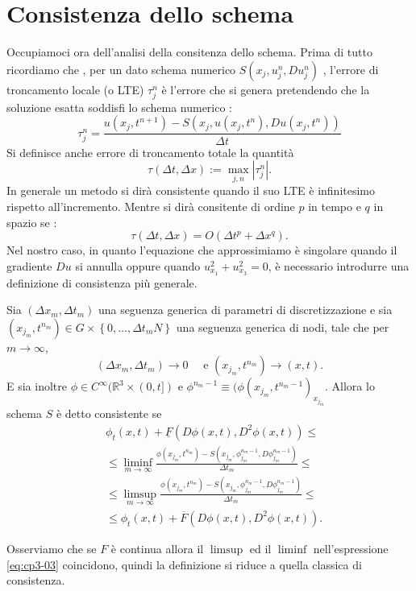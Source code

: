 \section{Consistenza dello schema}
Occupiamoci ora dell'analisi della consitenza dello schema. Prima di tutto ricordiamo che , per un dato schema numerico $S(x_j,u_j^n,Du_j^n)$ , l'errore di troncamento locale (o LTE) $\tau_j^n$ è l'errore che si genera pretendendo che la soluzione esatta soddisfi lo schema numerico :
\[
\tau_j^n=\frac{u(x_j,t^{n+1})-S(x_j,u(x_j,t^n),Du(x_j,t^n))}{\Delta t}
\]
Si definisce anche errore di troncamento totale la quantità
\[
\tau(\Delta t,\Delta x) := \max_{j,n} |\tau_j^n|.
\]
In generale un metodo si dirà consistente quando il suo LTE è infinitesimo rispetto all'incremento. Mentre si dirà consitente di ordine $p$ in tempo e $q$ in spazio se :
\[
\tau(\Delta t,\Delta x) = O(\Delta t^p +\Delta x^q).
\] 
Nel nostro caso, in quanto l'equazione che approssimiamo è singolare quando il gradiente  $Du$ si annulla oppure quando $u_{x_1}^2+u_{x_3}^2=0$, è necessario introdurre una definizione di consistenza più generale.
\begin{definizione}
Sia $(\Delta x_m,\Delta t_m)$ una seguenza generica di parametri di discretizzazione e sia $(x_{j_m},t^{n_m})\in G\times\left\{0,\dots,\Delta t_mN\right\}$ una seguenza generica di nodi, tale che per $m\to\infty$,
\[
(\Delta x_m,\Delta t_m)\to0 \quad\text{ e } (x_{j_m},t^{n_m})\to(x,t).
\]
E sia inoltre $\phi\in C^{\infty}(\mathbb{R}^3\times(0,t])$ e $\phi^{n_m-1}\equiv(\phi(x_{j_m},t^{n_m-1})_{x_{j_m}}$. Allora lo schema $S$ è detto consistente se
\begin{equation}
\label{eq:cp3-03}
\begin{split}
&\phi_t(x,t)+\underline{F}(D\phi(x,t),D^2\phi(x,t))\le \\
&\le\liminf_{m\to\infty}\frac{\phi(x_{j_m},t^{n_m})-S(x_{j_m},\phi_{j_m}^{n_m-1},D\phi_{j_m}^{n_m-1})}{\Delta t_m}\le \\
&\le\limsup_{m\to\infty}\frac{\phi(x_{j_m},t^{n_m})-S(x_{j_m},\phi_{j_m}^{n_m-1},D\phi_{j_m}^{n_m-1})}{\Delta t_m}\le \\
&\le\phi_t(x,t)+\overline{F}(D\phi(x,t),D^2\phi(x,t)).
\end{split}
\end{equation}
\end{definizione}
\begin{osservazione}
Osserviamo che se $F$ è continua allora il $\limsup$ ed il $\liminf$ nell'espressione \eqref{eq:cp3-03} coincidono, quindi la definizione si riduce a quella classica di consistenza.
\end{osservazione}

